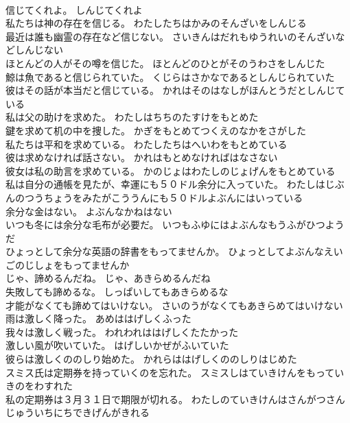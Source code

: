 \documentclass[8pt]{extreport}
\begin{document}
\begin{CJK}{UTF8}{min}
\\	信じてくれよ。	しんじてくれよ 
\\	私たちは神の存在を信じる。	わたしたちはかみのそんざいをしんじる 
\\	最近は誰も幽霊の存在など信じない。	さいきんはだれもゆうれいのそんざいなどしんじない 
\\	ほとんどの人がその噂を信じた。	ほとんどのひとがそのうわさをしんじた 
\\	鯨は魚であると信じられていた。	くじらはさかなであるとしんじられていた 
\\	彼はその話が本当だと信じている。	かれはそのはなしがほんとうだとしんじている 
\\	私は父の助けを求めた。	わたしはちちのたすけをもとめた 
\\	鍵を求めて机の中を捜した。	かぎをもとめてつくえのなかをさがした 
\\	私たちは平和を求めている。	わたしたちはへいわをもとめている 
\\	彼は求めなければ話さない。	かれはもとめなければはなさない 
\\	彼女は私の助言を求めている。	かのじょはわたしのじょげんをもとめている 
\\	私は自分の通帳を見たが、幸運にも５０ドル余分に入っていた。	わたしはじぶんのつうちょうをみたがこううんにも５０ドルよぶんにはいっている 
\\	余分な金はない。	よぶんなかねはない 
\\	いつも冬には余分な毛布が必要だ。	いつもふゆにはよぶんなもうふがひつようだ 
\\	ひょっとして余分な英語の辞書をもってませんか。	ひょっとしてよぶんなえいごのじしょをもってませんか 
\\	じゃ、諦めるんだね。	じゃ、あきらめるんだね 
\\	失敗しても諦めるな。	しっぱいしてもあきらめるな 
\\	才能がなくても諦めてはいけない。	さいのうがなくてもあきらめてはいけない 
\\	雨は激しく降った。	あめははげしくふった 
\\	我々は激しく戦った。	われわれははげしくたたかった 
\\	激しい風が吹いていた。	はげしいかぜがふいていた 
\\	彼らは激しくののしり始めた。	かれらははげしくののしりはじめた 
\\	スミス氏は定期券を持っていくのを忘れた。	スミスしはていきけんをもっていきのをわすれた 
\\	私の定期券は３月３１日で期限が切れる。	わたしのていきけんはさんがつさんじゅういちにちできげんがきれる 

\end{CJK}
\end{document}
